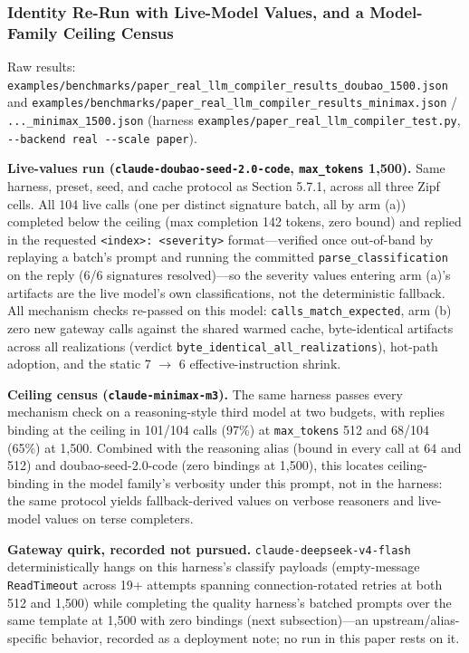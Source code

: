 \documentclass[
  11pt,
]{article}
\begin{document}
\subsubsection{Identity Re-Run with Live-Model Values, and a
Model-Family Ceiling
Census}\label{identity-re-run-with-live-model-values-and-a-model-family-ceiling-census}

Raw results:
\texttt{examples/benchmarks/paper\_real\_llm\_compiler\_results\_doubao\_1500.json}
and
\texttt{examples/benchmarks/paper\_real\_llm\_compiler\_results\_minimax.json}
/ \texttt{...\_minimax\_1500.json} (harness
\texttt{examples/paper\_real\_llm\_compiler\_test.py},
\texttt{-\/-backend\ real\ -\/-scale\ paper}).

\textbf{Live-values run (\texttt{claude-doubao-seed-2.0-code},
\texttt{max\_tokens} 1,500).} Same harness, preset, seed, and cache
protocol as Section 5.7.1, across all three Zipf cells. All 104 live
calls (one per distinct signature batch, all by arm (a)) completed below
the ceiling (max completion 142 tokens, zero bound) and replied in the
requested
\texttt{\textquotesingle{}\textless{}index\textgreater{}:\ \textless{}severity\textgreater{}\textquotesingle{}}
format---verified once out-of-band by replaying a batch's prompt and
running the committed \texttt{parse\_classification} on the reply (6/6
signatures resolved)---so the severity values entering arm (a)'s
artifacts are the live model's own classifications, not the
deterministic fallback. All mechanism checks re-passed on this model:
\texttt{calls\_match\_expected}, arm (b) zero new gateway calls against
the shared warmed cache, byte-identical artifacts across all
realizations (verdict \texttt{byte\_identical\_all\_realizations}),
hot-path adoption, and the static 7 \(\rightarrow\) 6
effective-instruction shrink.

\textbf{Ceiling census (\texttt{claude-minimax-m3}).} The same harness
passes every mechanism check on a reasoning-style third model at two
budgets, with replies binding at the ceiling in 101/104 calls (97\%) at
\texttt{max\_tokens} 512 and 68/104 (65\%) at 1,500. Combined with the
reasoning alias (bound in every call at 64 and 512) and
doubao-seed-2.0-code (zero bindings at 1,500), this locates
ceiling-binding in the model family's verbosity under this prompt, not
in the harness: the same protocol yields fallback-derived values on
verbose reasoners and live-model values on terse completers.

\textbf{Gateway quirk, recorded not pursued.}
\texttt{claude-deepseek-v4-flash} deterministically hangs on this
harness's classify payloads (empty-message \texttt{ReadTimeout} across
19+ attempts spanning connection-rotated retries at both 512 and 1,500)
while completing the quality harness's batched prompts over the same
template at 1,500 with zero bindings (next subsection)---an
upstream/alias-specific behavior, recorded as a deployment note; no run
in this paper rests on it.
\end{document}
